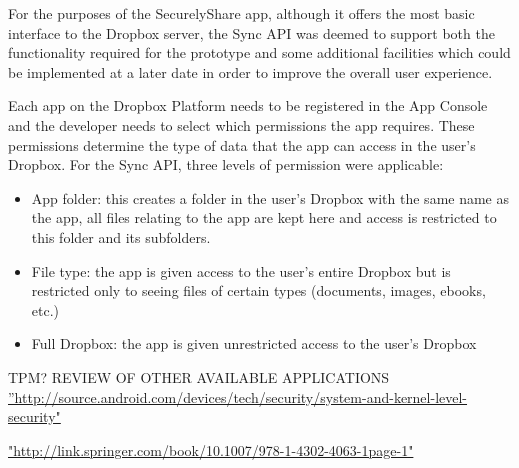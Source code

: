 For the purposes of the SecurelyShare app, although it offers the most basic interface to the Dropbox server, the Sync API was deemed to support both the functionality required for the prototype and some additional facilities which could be implemented at a later date in order to improve the overall user experience.

Each app on the Dropbox Platform needs to be registered in the App Console and the developer needs to select which permissions the app requires. These permissions determine the type of data that the app can access in the user's Dropbox.  For the Sync API, three levels of permission were applicable:
\begin{itemize}
\item App folder:  this creates a folder in the user's Dropbox with the same name as the app, all files relating to the app are kept here and access is restricted to this folder and its subfolders.
\item File type: the app is given access to the user's entire Dropbox but is restricted only to seeing files of certain types (documents, images, ebooks, etc.)  
\item Full Dropbox:  the app is given unrestricted access to the user's Dropbox

\end{itemize}


TPM?
REVIEW OF OTHER AVAILABLE APPLICATIONS
\hyperref[label_name]{''http://source.android.com/devices/tech/security/system-and-kernel-level-security"}



\hyperref[label_name2]{"http://link.springer.com/book/10.1007/978-1-4302-4063-1page-1"}

